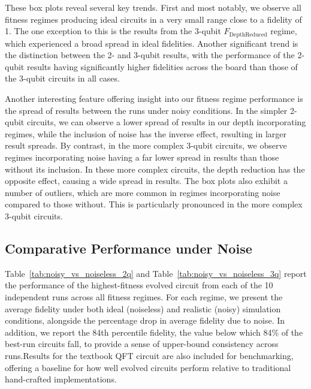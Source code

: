 \documentclass[11pt,a4paper]{article}
\begin{document}
These box plots reveal several key trends. First and most notably, we observe all fitness regimes producing ideal circuits in a very small range close to a fidelity of 1. The one exception to this is the results from the 3-qubit $F_{\mathrm{DepthReduced}}$ regime, which experienced a broad spread in ideal fidelities. Another significant trend is the distinction between the 2- and 3-qubit results, with the performance of the 2-qubit results having significantly higher fidelities across the board than those of the 3-qubit circuits in all cases.\newline

Another interesting feature offering insight into our fitness regime performance is the spread of results between the runs under noisy conditions. In the simpler 2-qubit circuits, we can observe a lower spread of results in our depth incorporating regimes, while the inclusion of noise has the inverse effect, resulting in larger result spreads. By contrast, in the more complex 3-qubit circuits, we observe regimes incorporating noise having a far lower spread in results than those without its inclusion. In these more complex circuits, the depth reduction has the opposite effect, causing a wide spread in results. The box plots also exhibit a number of outliers, which are more common in regimes incorporating noise compared to those without. This is particularly pronounced in the more complex 3-qubit circuits.

\subsection{Comparative Performance under Noise}\label{sec:performance_tables}
Table~\ref{tab:noisy_vs_noiseless_2q} and Table~\ref{tab:noisy_vs_noiseless_3q} report the performance of the highest-fitness evolved circuit from each of the 10 independent runs across all fitness regimes. For each regime, we present the average fidelity under both ideal (noiseless) and realistic (noisy) simulation conditions, alongside the percentage drop in average fidelity due to noise. In addition, we report the 84th percentile fidelity, the value below which 84\% of the best-run circuits fall, to provide a sense of upper-bound consistency across runs.Results for the textbook QFT circuit are also included for benchmarking, offering a baseline for how well evolved circuits perform relative to traditional hand-crafted implementations.
\end{document}
